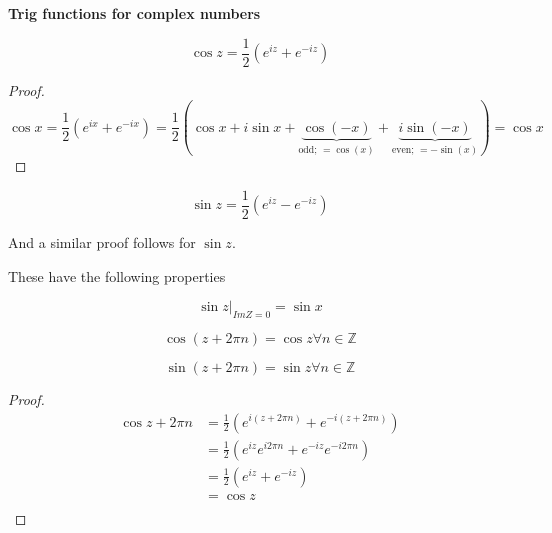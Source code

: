 \documentclass[10pt]{article}
\begin{document}
\begin{definition}
	\textbf{Trig functions for complex numbers} 

	\begin{equation}
		\cos z = \frac{1}{2} \left( e^{iz} + e^{-iz} \right)
	\end{equation}

	\begin{proof}
	\begin{equation}
		\cos x = \frac{1}{2} (e^{ix} + e^{-ix}) = \frac{1}{2} 
		\left( \cos x 
		+ i \sin x 
		+ \underbrace{\cos(-x)}_{\text{odd; } = \cos(x)}
		+ \underbrace{i \sin(-x)}_{\text{even; } = -\sin(x)} \right)
		= \cos x
	\end{equation}
	\end{proof}
	

	\begin{equation}
		\sin z = \frac{1}{2} \left( e^{iz} - e^{-iz} \right)
	\end{equation}

	And a similar proof follows for $\sin z$.

	These have the following properties


	\begin{equation}
		\sin z |_{Im Z = 0} = \sin x
	\end{equation}

	\begin{equation}
		\cos(z + 2 \pi n) = \cos z \forall n \in \mathbb{Z}
	\end{equation}

	\begin{equation}
		\sin(z + 2 \pi n) = \sin z \forall n \in \mathbb{Z}
	\end{equation}
\end{definition}

\begin{proof}
	\begin{equation}
		\begin{split}
			\cos z + 2\pi n &= \frac{1}{2}(e^{i(z+2\pi n)} + e^{-i(z+2\pi n)}) \\
											&= \frac{1}{2}(e^{iz}e^{i2\pi n} + e^{-iz}e^{-i2\pi n}) \\
											&= \frac{1}{2}(e^{iz} + e^{-iz}) \\
											&= \cos z \\
		\end{split}
	\end{equation}

\end{proof}
\end{document}
